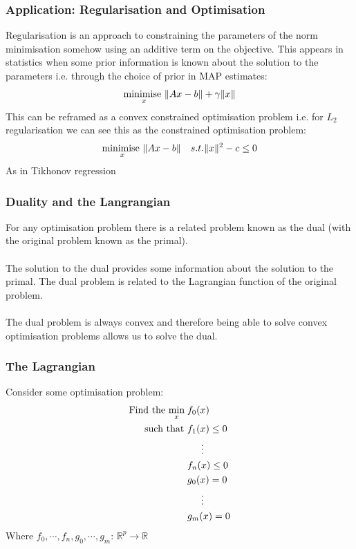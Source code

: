 \documentclass{beamer}
\DeclarePairedDelimiter\norm{\lVert}{\rVert}
\def\rnum{\mathbb{R}}
\begin{document}
\begin{frame}
    \frametitle{Application: Regularisation and Optimisation}
    Regularisation is an approach to constraining the parameters of the norm
    minimisation somehow using an additive term on the objective. This appears
    in statistics when some prior information is known about the solution to the
    parameters i.e. through the choice of prior in MAP estimates:
    \begin{align*}
        \underset{x}{\text{minimise }} \norm{Ax - b}+ \gamma\norm{x}
    \end{align*}
    This can be reframed as a convex constrained optimisation problem i.e. for
    $L_{2}$ regularisation we can see this as the constrained optimisation
    problem:
    \begin{align*}
        &\underset{x}{\text{minimise }} \norm{Ax - b}
        &s.t. \norm{x}^{2} - c \leq 0
    \end{align*}
    As in Tikhonov regression
\end{frame}

\begin{frame}
    \frametitle{Duality and the Langrangian}
    For any optimisation problem there is a related problem known as the dual
    (with the original problem known as the primal).
    \\~\\
    The solution to the dual provides some information about the solution to the
    primal. The dual problem is related to the Lagrangian function of the
    original problem.
    \\~\\
    The dual problem is always convex and therefore being able to solve
    convex optimisation problems allows us to solve the dual.
\end{frame}

\begin{frame}
    \frametitle{The Lagrangian}
    Consider some optimisation problem:
    {\footnotesize
    \begin{align*}
        \text{Find the }\underset{x}{\text{min}}\; &f_{0}(x) \\
        \text{  such that }&f_{1}(x) \leq 0 \\
        & \hspace{5mm} \vdots \\
        &f_{n}(x) \leq 0 \\
        &g_{0}(x) = 0 \\
        &\hspace{5mm} \vdots \\
        &g_{m}(x) = 0
    \end{align*}}
    Where $f_0,\cdots, f_n, g_0, \cdots, g_m:\, \rnum^{p} \rightarrow \rnum$
\end{frame}
\end{document}
